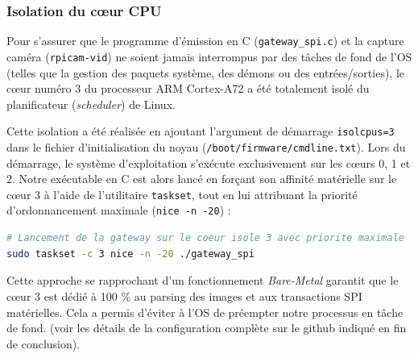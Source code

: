 \subsubsection{Isolation du cœur CPU}
Pour s'assurer que le programme d'émission en C (\texttt{gateway\_spi.c}) et la capture caméra (\texttt{rpicam-vid}) 
ne soient jamais interrompus par des tâches de fond de l'OS (telles que la gestion des paquets système, des démons 
ou des entrées/sorties), le cœur numéro 3 du processeur ARM Cortex-A72 a été totalement isolé du planificateur (\textit{scheduler}) 
de Linux.

Cette isolation a été réalisée en ajoutant l'argument de démarrage \texttt{isolcpus=3} dans le fichier d'initialisation du noyau (\texttt{/boot/firmware/cmdline.txt}). 
Lors du démarrage, le système d'exploitation s'exécute exclusivement sur les cœurs 0, 1 et 2. Notre exécutable en C est 
alors lancé en forçant son affinité matérielle sur le cœur 3 à l'aide de l'utilitaire \texttt{taskset}, tout en lui attribuant 
la priorité d'ordonnancement maximale (\texttt{nice -n -20}) :

\begin{lstlisting}[language=bash]
# Lancement de la gateway sur le coeur isole 3 avec priorite maximale
sudo taskset -c 3 nice -n -20 ./gateway_spi
\end{lstlisting}

Cette approche se rapprochant d'un fonctionnement \textit{Bare-Metal} garantit que le cœur 3 est dédié à 100 \% 
au parsing des images et aux transactions SPI matérielles. Cela a permis d'éviter à l'OS de préempter notre processus 
en tâche de fond. (voir les détails de la configuration complète sur le github indiqué en fin de conclusion).